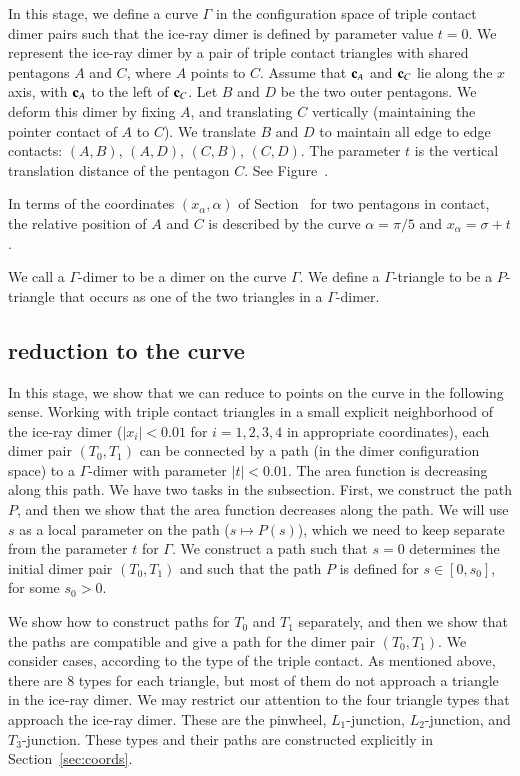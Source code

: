 In this stage, we define a curve $\Gamma$ in the configuration space of triple contact dimer pairs such that the ice-ray dimer
is defined by parameter value $t=0$.  We represent the ice-ray dimer by a pair of triple contact triangles with shared pentagons
$A$ and $C$, where $A$ points to $C$.  Assume that ${\mathbf c}_A$ and ${\mathbf c}_C$ lie along the $x$ axis, with ${\mathbf c}_A$ to the left
of ${\mathbf c}_C$.  Let $B$ and $D$ be the two outer pentagons.  We deform this dimer by fixing $A$,
and translating $C$ vertically (maintaining the pointer contact of $A$ to $C$).  We translate $B$ and $D$ to maintain
all edge to edge contacts: $(A,B)$, $(A,D)$, $(C,B)$, $(C,D)$.   The parameter $t$ is the vertical translation distance of the pentagon $C$.
See Figure~.


In terms of the coordinates $(x_\alpha,\alpha)$ of Section~ for two pentagons in contact, the relative position of $A$ and $C$
is described by the curve $\alpha=\pi/5$ and $x_\alpha = \sigma+t$.

We call a $\Gamma$-dimer to be a dimer on the curve $\Gamma$.  We define a $\Gamma$-triangle to be a $P$-triangle that
occurs as one of the two triangles in a $\Gamma$-dimer.


\subsection{reduction to the curve}

In this stage, we show that we can reduce to points on the curve in the following sense.
Working with triple contact triangles in a small explicit neighborhood of the
ice-ray dimer ($|x_i|<0.01$ for $i=1,2,3,4$ in appropriate coordinates),
each dimer pair $(T_0,T_1)$ can be connected by a path (in the dimer configuration
space) to a $\Gamma$-dimer  with parameter $|t|<0.01$.
The area function is decreasing along this path.
We have two tasks in the subsection.  First, we construct the path $P$, and 
then we show that the area function decreases along the path.  We will use
$s$ as a local parameter on the path ($s\mapsto P(s)$), 
which we need to keep separate from
the parameter $t$ for $\Gamma$.  We construct a path such that $s=0$ determines the
initial dimer pair $(T_0,T_1)$ and such that the path $P$ is defined for $s\in [0,s_0]$, for some $s_0>0$.

We show how to construct paths for $T_0$ and $T_1$ separately, and then
we show that the paths are compatible and give a path for the dimer pair $(T_0,T_1)$.
We consider cases, according to the type of the triple contact.
As mentioned above, there are $8$ types for each triangle, but most of them do not
approach a triangle in the ice-ray dimer.  We may restrict our attention
to the four triangle types that approach the ice-ray dimer.   These are the pinwheel, $L_1$-junction,
$L_2$-junction, and $T_3$-junction.  
These types and their paths are constructed explicitly in  Section~\ref{sec:coords}.

